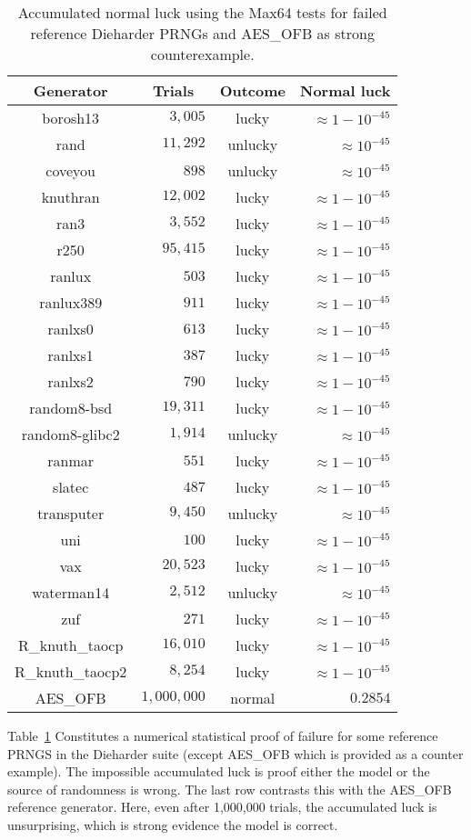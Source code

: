 \begin{table}
\caption{\label{tab:maxluck}Accumulated normal luck using the Max64 tests for failed reference Dieharder PRNGs and AES\_OFB as strong counterexample.}
\begin{tabular}{|c|r|c|r|}
\multicolumn{1}{c}{Generator} &
\multicolumn{1}{c}{Trials} &
\multicolumn{1}{c}{Outcome} &
\multicolumn{1}{c}{Normal luck} \\
\hline
borosh13 & $3,005$ & lucky &  $\approx 1-10^{-45}$ \\
rand & $11,292$ & unlucky &  $\approx 10^{-45}$ \\
coveyou & $898$ & unlucky & $\approx 10^{-45}$ \\
knuthran & $12,002$ & lucky & $\approx 1-10^{-45}$ \\
ran3 & $3,552$ & lucky & $\approx 1-10^{-45}$ \\
r250 & $95,415$ & lucky & $\approx 1-10^{-45}$ \\
ranlux & $503$ & lucky & $\approx 1-10^{-45}$ \\
ranlux389 & $911$ & lucky & $\approx 1-10^{-45}$ \\
ranlxs0 & $613$ & lucky & $\approx 1-10^{-45}$ \\
ranlxs1 & $387$ & lucky & $\approx 1-10^{-45}$ \\
ranlxs2 & $790$ & lucky & $\approx 1-10^{-45}$ \\
random8-bsd & $19,311$ & lucky & $\approx 1-10^{-45}$ \\
random8-glibc2 & $1,914$ & unlucky & $\approx 10^{-45}$ \\
ranmar & $551$ & lucky & $\approx 1-10^{-45}$ \\
slatec & $487$ & lucky & $\approx 1-10^{-45}$ \\
transputer & $9,450$  & unlucky & $\approx 10^{-45}$ \\
uni & $100$ & lucky & $\approx 1-10^{-45}$ \\
vax & $20,523$ & lucky & $\approx 1-10^{-45}$ \\
waterman14 & $2,512$ & unlucky & $\approx 10^{-45}$ \\
zuf & $271$ & lucky & $\approx 1-10^{-45}$ \\
R\_knuth\_taocp & $16,010$ & lucky & $\approx 1-10^{-45}$ \\
R\_knuth\_taocp2 & $8,254$ & lucky & $\approx 1-10^{-45}$ \\
AES\_OFB & $1,000,000$ & normal & $0.2854$ \\
\hline
\end{tabular}
\end{table}
Table~\ref{tab:maxluck} Constitutes a numerical statistical proof of failure for some reference PRNGS in the Dieharder suite (except AES\_OFB which is provided as a counter example).  The impossible accumulated luck is proof either the model or the source of randomness is wrong.  The last row contrasts this with the AES\_OFB reference generator.  Here, even after 1,000,000 trials, the accumulated luck is unsurprising, which is strong evidence the model is correct.

